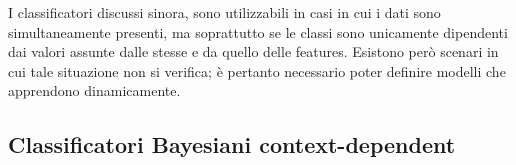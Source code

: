 \documentclass{subfiles}
\begin{document}
I classificatori discussi sinora, sono utilizzabili in casi in cui i dati sono simultaneamente presenti,
ma soprattutto se le classi sono unicamente dipendenti dai valori assunte dalle stesse e da quello delle features.
Esistono però scenari in cui tale situazione non si verifica; è pertanto necessario poter definire modelli che apprendono dinamicamente.

\subsection{Classificatori Bayesiani context-dependent}

\end{document}
